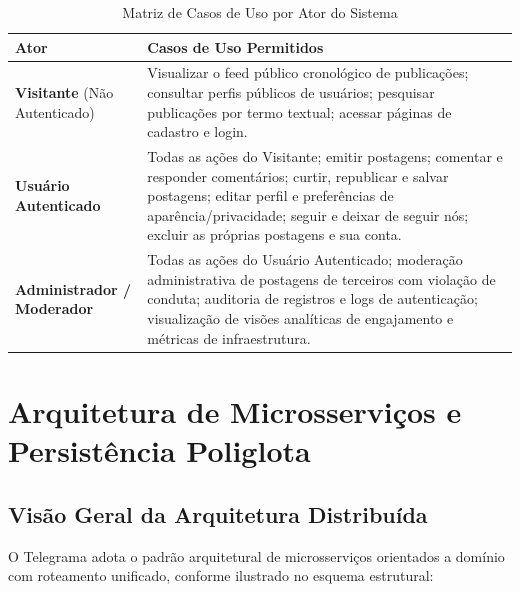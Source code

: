 \documentclass[12pt,a4paper]{report}
\begin{document}
\begin{table}[H]
\centering
\small
\caption{Matriz de Casos de Uso por Ator do Sistema}
\label{tab:casos_uso}
\begin{tabular}{@{}p{3.5cm}p{11cm}@{}}
\toprule
\textbf{Ator} & \textbf{Casos de Uso Permitidos} \\ \midrule
\textbf{Visitante} (Não Autenticado) & Visualizar o feed público cronológico de publicações; consultar perfis públicos de usuários; pesquisar publicações por termo textual; acessar páginas de cadastro e login. \\ \addlinespace
\textbf{Usuário Autenticado} & Todas as ações do Visitante; emitir postagens; comentar e responder comentários; curtir, republicar e salvar postagens; editar perfil e preferências de aparência/privacidade; seguir e deixar de seguir nós; excluir as próprias postagens e sua conta. \\ \addlinespace
\textbf{Administrador / Moderador} & Todas as ações do Usuário Autenticado; moderação administrativa de postagens de terceiros com violação de conduta; auditoria de registros e logs de autenticação; visualização de visões analíticas de engajamento e métricas de infraestrutura. \\ \bottomrule
\end{tabular}
\end{table}

\chapter{Arquitetura de Microsserviços e Persistência Poliglota}

\section{Visão Geral da Arquitetura Distribuída}
O Telegrama adota o padrão arquitetural de microsserviços orientados a domínio com roteamento unificado, conforme ilustrado no esquema estrutural:
\end{document}
